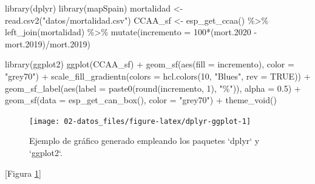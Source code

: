 \documentclass[
  spanish,
]{book}
\newenvironment{Shaded}{\begin{snugshade}}{\end{snugshade}}
\newcommand{\AttributeTok}[1]{\textcolor[rgb]{0.77,0.63,0.00}{#1}}
\newcommand{\ConstantTok}[1]{\textcolor[rgb]{0.00,0.00,0.00}{#1}}
\newcommand{\DecValTok}[1]{\textcolor[rgb]{0.00,0.00,0.81}{#1}}
\newcommand{\FloatTok}[1]{\textcolor[rgb]{0.00,0.00,0.81}{#1}}
\newcommand{\FunctionTok}[1]{\textcolor[rgb]{0.00,0.00,0.00}{#1}}
\newcommand{\NormalTok}[1]{#1}
\newcommand{\OtherTok}[1]{\textcolor[rgb]{0.56,0.35,0.01}{#1}}
\newcommand{\SpecialCharTok}[1]{\textcolor[rgb]{0.00,0.00,0.00}{#1}}
\newcommand{\StringTok}[1]{\textcolor[rgb]{0.31,0.60,0.02}{#1}}
\theoremstyle{break}
\theoremstyle{definition}
\theoremstyle{definition}
\theoremstyle{definition}
\theoremstyle{definition}
\theoremstyle{remark}
\begin{document}
\begin{Shaded}
\begin{Highlighting}[]
\FunctionTok{library}\NormalTok{(dplyr)}
\FunctionTok{library}\NormalTok{(mapSpain) }
\NormalTok{mortalidad }\OtherTok{\textless{}{-}} \FunctionTok{read.csv2}\NormalTok{(}\StringTok{"datos/mortalidad.csv"}\NormalTok{)}
\NormalTok{CCAA\_sf }\OtherTok{\textless{}{-}} \FunctionTok{esp\_get\_ccaa}\NormalTok{() }\SpecialCharTok{\%\textgreater{}\%} \FunctionTok{left\_join}\NormalTok{(mortalidad) }\SpecialCharTok{\%\textgreater{}\%}
  \FunctionTok{mutate}\NormalTok{(}\AttributeTok{incremento =} \DecValTok{100}\SpecialCharTok{*}\NormalTok{(mort}\FloatTok{.2020} \SpecialCharTok{{-}}\NormalTok{ mort}\FloatTok{.2019}\NormalTok{)}\SpecialCharTok{/}\NormalTok{mort}\FloatTok{.2019}\NormalTok{)}

\FunctionTok{library}\NormalTok{(ggplot2)}
\FunctionTok{ggplot}\NormalTok{(CCAA\_sf) }\SpecialCharTok{+}
  \FunctionTok{geom\_sf}\NormalTok{(}\FunctionTok{aes}\NormalTok{(}\AttributeTok{fill =}\NormalTok{ incremento), }\AttributeTok{color =} \StringTok{"grey70"}\NormalTok{) }\SpecialCharTok{+}
  \FunctionTok{scale\_fill\_gradientn}\NormalTok{(}\AttributeTok{colors =} \FunctionTok{hcl.colors}\NormalTok{(}\DecValTok{10}\NormalTok{, }\StringTok{"Blues"}\NormalTok{, }\AttributeTok{rev =} \ConstantTok{TRUE}\NormalTok{)) }\SpecialCharTok{+}
  \FunctionTok{geom\_sf\_label}\NormalTok{(}\FunctionTok{aes}\NormalTok{(}\AttributeTok{label =} \FunctionTok{paste0}\NormalTok{(}\FunctionTok{round}\NormalTok{(incremento, }\DecValTok{1}\NormalTok{), }\StringTok{"\%"}\NormalTok{)), }\AttributeTok{alpha =} \FloatTok{0.5}\NormalTok{) }\SpecialCharTok{+}
  \FunctionTok{geom\_sf}\NormalTok{(}\AttributeTok{data =} \FunctionTok{esp\_get\_can\_box}\NormalTok{(), }\AttributeTok{color =} \StringTok{"grey70"}\NormalTok{) }\SpecialCharTok{+} 
  \FunctionTok{theme\_void}\NormalTok{()}
\end{Highlighting}
\end{Shaded}

\begin{figure}[!htb]

{\centering \texttt{[image: 02-datos\_files/figure-latex/dplyr-ggplot-1]} 

}

\caption{Ejemplo de gráfico generado empleando los paquetes `dplyr` y `ggplot2`.}\label{fig:dplyr-ggplot}
\end{figure}

{[}Figura \ref{fig:dplyr-ggplot}{]}
\end{document}
